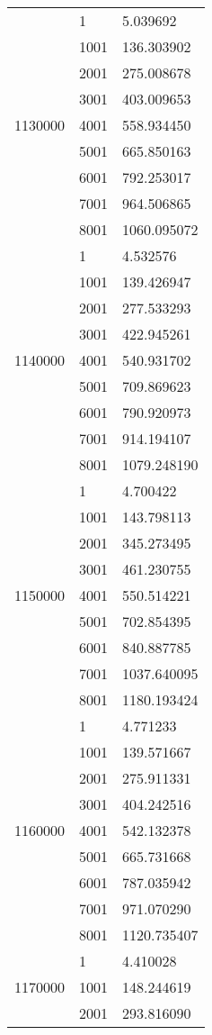 \begin{table}[htb!]
\begin{tabular}{lll}
\multirow[c]{9}{*}{1130000} & 1 & 5.039692 \\
 & 1001 & 136.303902 \\
 & 2001 & 275.008678 \\
 & 3001 & 403.009653 \\
 & 4001 & 558.934450 \\
 & 5001 & 665.850163 \\
 & 6001 & 792.253017 \\
 & 7001 & 964.506865 \\
 & 8001 & 1060.095072 \\
\multirow[c]{9}{*}{1140000} & 1 & 4.532576 \\
 & 1001 & 139.426947 \\
 & 2001 & 277.533293 \\
 & 3001 & 422.945261 \\
 & 4001 & 540.931702 \\
 & 5001 & 709.869623 \\
 & 6001 & 790.920973 \\
 & 7001 & 914.194107 \\
 & 8001 & 1079.248190 \\
\multirow[c]{9}{*}{1150000} & 1 & 4.700422 \\
 & 1001 & 143.798113 \\
 & 2001 & 345.273495 \\
 & 3001 & 461.230755 \\
 & 4001 & 550.514221 \\
 & 5001 & 702.854395 \\
 & 6001 & 840.887785 \\
 & 7001 & 1037.640095 \\
 & 8001 & 1180.193424 \\
\multirow[c]{9}{*}{1160000} & 1 & 4.771233 \\
 & 1001 & 139.571667 \\
 & 2001 & 275.911331 \\
 & 3001 & 404.242516 \\
 & 4001 & 542.132378 \\
 & 5001 & 665.731668 \\
 & 6001 & 787.035942 \\
 & 7001 & 971.070290 \\
 & 8001 & 1120.735407 \\
\multirow[c]{9}{*}{1170000} & 1 & 4.410028 \\
 & 1001 & 148.244619 \\
 & 2001 & 293.816090 \\

\end{tabular}
\end{table}
